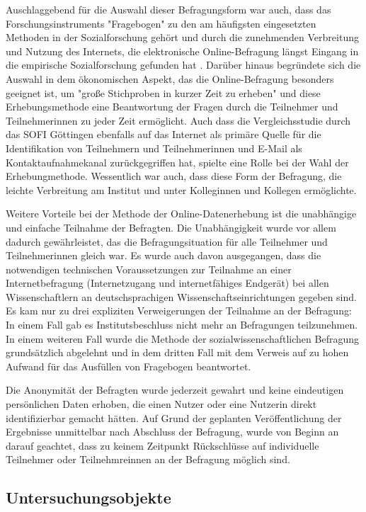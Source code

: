 Auschlaggebend für die Auswahl dieser Befragungsform war auch, dass das Forschungsinstruments "Fragebogen" zu den am häufigsten eingesetzten Methoden in der Sozialforschung gehört \cite{raab_2012_fragebogen} und durch die zunehmenden Verbreitung und Nutzung des Internets, die elektronische Online-Befragung längst Eingang in die empirische Sozialforschung gefunden hat \cite{Pannewitz_2002}. Darüber hinaus begründete sich die Auswahl in dem ökonomischen Aspekt, das die Online-Befragung besonders geeignet ist, um "große Stichproben in kurzer Zeit zu erheben" \cite{eichhorn_2004_online} und diese Erhebungsmethode eine Beantwortung der Fragen durch die Teilnehmer und Teilnehmerinnen zu jeder Zeit ermöglicht. Auch dass die Vergleichsstudie durch das SOFI Göttingen ebenfalls auf das Internet als primäre Quelle für die Identifikation von Teilnehmern und Teilnehmerinnen und E-Mail als Kontaktaufnahmekanal zurückgegriffen hat, spielte eine Rolle bei der Wahl der Erhebungmethode. Wessentlich war auch, dass diese Form der Befragung, die leichte Verbreitung am Institut und unter Kolleginnen und Kollegen ermöglichte.

Weitere Vorteile bei der Methode der Online-Datenerhebung ist die unabhängige und einfache Teilnahme der Befragten. Die Unabhängigkeit wurde vor allem dadurch gewährleistet, das die Befragungsituation für alle Teilnehmer und Teilnehmerinnen gleich war. Es wurde auch davon ausgegangen, dass die notwendigen technischen Voraussetzungen zur Teilnahme an einer Internetbefragung (Internetzugang und internetfähiges Endgerät) bei allen Wissenschaftlern an deutschsprachigen Wissenschaftseinrichtungen gegeben sind. Es kam nur zu drei expliziten Verweigerungen der Teilnahme an der Befragung: In einem Fall gab es Institutsbeschluss nicht mehr an Befragungen teilzunehmen. In einem weiteren Fall wurde die Methode der sozialwissenschaftlichen Befragung grundsätzlich abgelehnt und in dem dritten Fall mit dem Verweis auf zu hohen Aufwand für das Ausfüllen von Fragebogen beantwortet.

Die Anonymität der Befragten wurde jederzeit gewahrt und keine eindeutigen persönlichen Daten erhoben, die einen Nutzer oder eine Nutzerin direkt identifizierbar gemacht hätten. Auf Grund der geplanten Veröffentlichung der Ergebnisse unmittelbar nach Abschluss der Befragung, wurde von Beginn an darauf geachtet, dass zu keinem Zeitpunkt Rückschlüsse auf individuelle Teilnehmer oder Teilnehmreinnen an der Befragung möglich sind.

\subsection{Untersuchungsobjekte}

